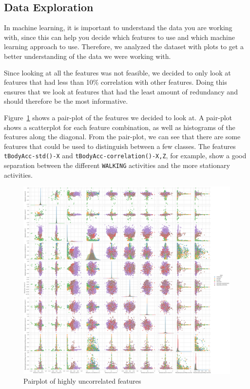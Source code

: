 \subsection{Data Exploration}\label{subsec:data-exploration}

In machine learning, it is important to understand the data you are working with, since this can help you decide which features to use and which machine learning approach to use.
Therefore, we analyzed the dataset with plots to get a better understanding of the data we were working with.

Since looking at all the features was not feasible, we decided to only look at features that had less than 10\% correlation with other features.
Doing this ensures that we look at features that had the least amount of redundancy and should therefore be the most informative.

Figure~\ref{fig:pairplot} shows a pair-plot of the features we decided to look at.
A pair-plot shows a scatterplot for each feature combination, as well as histograms of the features along the diagonal.
From the pair-plot, we can see that there are some features that could be used to distinguish between a few classes.
The features \texttt{tBodyAcc-std()-X} and \texttt{tBodyAcc-correlation()-X,Z}, for example, show a good separation between the different \texttt{WALKING} activities and the more stationary activities.

\begin{figure}[ht]
    \centering
    \includegraphics[width=\textwidth]{./img/pairplot}
    \caption{Pairplot of highly uncorrelated features}
    \label{fig:pairplot}
\end{figure}

